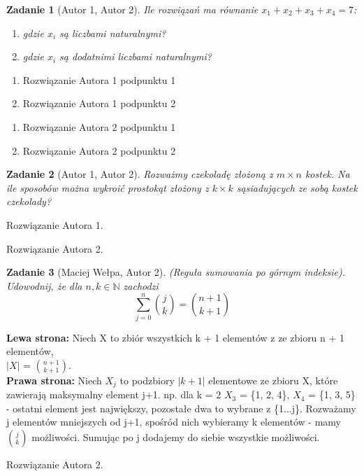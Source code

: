 \documentclass{mwart}
\newtheorem{zad}{Zadanie}[section]
\begin{document}
\begin{zad}[Autor 1, Autor 2]
    Ile rozwiązań ma równanie $x_1 + x_2+x_3+x_4 = 7$:
    \begin{enumerate}
        \item gdzie $x_i$ są liczbami naturalnymi?
        \item gdzie $x_i$ są dodatnimi liczbami naturalnymi?
    \end{enumerate}
\end{zad}
\begin{mdframed}
    \begin{enumerate}
        \item Rozwiązanie Autora 1 podpunktu 1
        \item Rozwiązanie Autora 1 podpunktu 2
    \end{enumerate}
\end{mdframed}
\begin{mdframed}
    \begin{enumerate}
        \item Rozwiązanie Autora 2 podpunktu 1
        \item Rozwiązanie Autora 2 podpunktu 2
    \end{enumerate}
\end{mdframed}




\begin{zad}[Autor 1, Autor 2]
    Rozważmy czekoladę złożoną z $m\times n$ kostek.
    Na ile sposobów można wykroić prostokąt złożony z $k \times k$
    sąsiadujących ze sobą kostek czekolady?
\end{zad}
\begin{mdframed}
    Rozwiązanie Autora 1.
\end{mdframed}
\begin{mdframed}
    Rozwiązanie Autora 2.
\end{mdframed}




\begin{zad}[Maciej Wełpa, Autor 2]
    (Reguła sumowania po górnym indeksie). Udowodnij, że dla
    $n, k \in \mathbb{N}$ zachodzi
    \[\sum_{j=0}^n\binom{j}{k} = \binom{n+1}{k+1}\]
\end{zad}
\begin{mdframed}
    \textbf{Lewa strona:} 
    Niech X to zbiór wszystkich k + 1 elementów z ze zbioru n + 1 elementów, \\
    \(|X|\) = \(\binom{n + 1}{k + 1}\). \\ 
    \textbf{Prawa strona:} Niech \( X_j \) to podzbiory \(|k+1|\) elementowe ze zbioru X, które
    zawierają maksymalny element j+1. np. dla k = 2 \( X_3 \) = \{1, 2, 4\}, \( X_4 \) = \{1, 3, 5\} 
    - ostatni element jest największy, pozostałe dwa to wybrane z \{1...j\}. Rozważamy j elementów mniejszych od j+1, spośród nich wybieramy k elementów - mamy \(\binom{j}{k}\) możliwości. Sumując po j dodajemy do siebie wszystkie możliwości.
\end{mdframed}
\begin{mdframed}
    Rozwiązanie Autora 2.
\end{mdframed}
\end{document}
